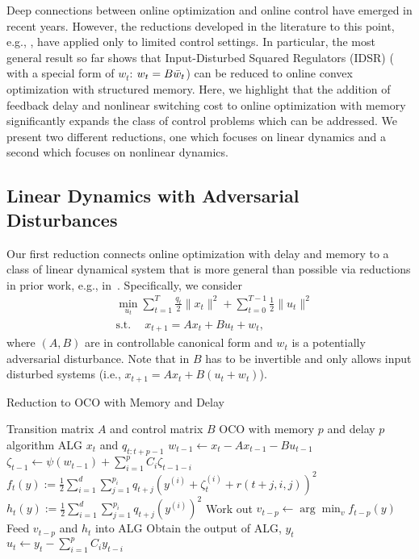 Deep connections between online optimization and online control have emerged in recent years.  However, the reductions developed in the literature to this point, e.g., \citep{goel2019beyond,shi2020online}, have applied only to limited control settings.  In particular, the most general result so far shows that Input-Disturbed Squared Regulators (IDSR) ( with a special form of $w_t$: $w_t=B\Bar{w}_t$) can be reduced to online convex optimization with structured memory. Here, we highlight that the addition of feedback delay and nonlinear switching cost to online optimization with memory significantly expands the class of control problems which can be addressed.  We present two different reductions, one which focuses on linear dynamics and a second which focuses on nonlinear dynamics.  


\subsection{Linear Dynamics with Adversarial Disturbances}\label{Delay2OnlineControl}

Our first reduction connects online optimization with delay and memory to a class of linear dynamical system that is more general than possible via reductions in prior work, e.g., in~\citep{goel2019online,shi2020online}. Specifically, we consider 
\begin{equation}
\label{eq:example-1}
\begin{aligned}
    &\min_{u_t}\sum_{t=1}^{T} \frac{q_t}{2}\|x_t\|^2 + \sum_{t=0}^{T-1}\frac{1}{2}\|u_t\|^2 \\
    &\mathrm{s.t.~}\quad x_{t+1}=Ax_t+Bu_t+w_t,
\end{aligned}    
\end{equation}
where $(A,B)$ are in controllable canonical form and $w_t$ is a potentially adversarial disturbance. Note that in \citep{goel2019online} $B$ has to be invertible and \citep{shi2020online} only allows input disturbed systems (i.e., $x_{t+1}=Ax_t+B(u_t+w_t)$). 

\begin{algorithm}[t!]
   \caption{Reduction to OCO with Memory and Delay}
   \label{a.reduction}
\begin{algorithmic}[1]
    Transition matrix $A$ and control matrix $B$
    OCO with memory $p$ and delay $p$ algorithm ALG
         $x_t$ and $q_{t:t+p-1}$
            \STATE $w_{t-1}\leftarrow x_t-Ax_{t-1}-Bu_{t-1}$
            \STATE $\zeta_{t-1}\leftarrow\psi(w_{t-1})+\sum_{i=1}^pC_i\zeta_{t-1-i}$
        \ENDIF
        \STATE $f_t(y):=\frac{1}{2}\sum\limits_{i=1}^d\sum\limits_{j=1}^{p_i}q_{t+j}\left(y^{(i)}+\zeta_t^{(i)}+r(t+j,i,j)\right)^2$
        \STATE $h_t(y):=\frac{1}{2}\sum\limits_{i=1}^d\sum\limits_{j=1}^{p_i}q_{t+j}\left(y^{(i)}\right)^2$
        \STATE Work out $v_{t-p}\leftarrow\arg\min_vf_{t-p}(y)$
        \STATE Feed $v_{t-p}$ and $h_t$ into ALG
        \STATE Obtain the output of ALG, $y_t$
        \STATE $u_t\leftarrow y_t-\sum_{i=1}^pC_iy_{t-i}$
   \ENDFOR
\end{algorithmic}
\end{algorithm}


